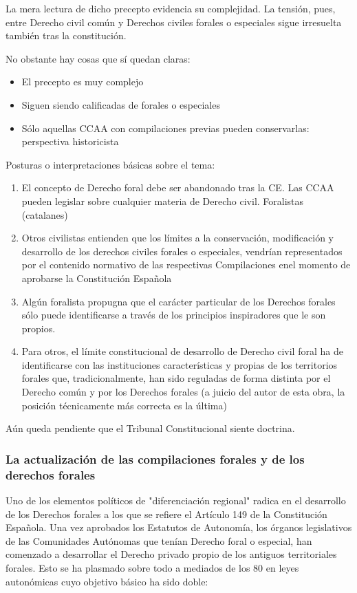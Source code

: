 \documentclass[a4paper,12pt]{report}
\begin{document}
La mera lectura de dicho precepto evidencia su complejidad. La tensión, pues,
entre Derecho civil común y Derechos civiles forales o especiales sigue
irresuelta también tras la constitución.

No obstante hay cosas que sí quedan claras:

\begin{itemize}
    \item{El precepto es muy complejo}
    \item{Siguen siendo calificadas de forales o especiales}
    \item{Sólo aquellas CCAA con compilaciones previas pueden conservarlas:
        perspectiva historicista}
\end{itemize}

Posturas o interpretaciones básicas sobre el tema:

\begin{enumerate}
\item{El concepto de Derecho foral debe ser abandonado tras la CE. Las CCAA
    pueden legislar sobre cualquier materia de Derecho civil. Foralistas
(catalanes)}
\item{Otros civilistas entienden que los límites a la conservación, modificación
    y desarrollo de los derechos civiles forales o especiales, vendrían
representados por el contenido normativo de las respectivas Compilaciones enel
momento de aprobarse la Constitución Española}
\item{Algún foralista propugna que el carácter particular de los Derechos
    forales sólo puede identificarse a través de los principios inspiradores que
le son propios.}
\item{Para otros, el límite constitucional de desarrollo de Derecho civil foral
    ha de identificarse con las instituciones características y propias de los
territorios forales que, tradicionalmente, han sido reguladas de forma distinta
por el Derecho común y por los Derechos forales (a juicio del autor de esta
obra, la posición técnicamente más correcta es la última)}
\end{enumerate}

Aún queda pendiente que el Tribunal Constitucional siente doctrina.

\subsubsection{La actualización de las compilaciones forales y de los derechos forales}

Uno de los elementos políticos de "diferenciación regional" radica en el
desarrollo de los Derechos forales a los que se refiere el Artículo 149 de la
Constitución Española. Una vez aprobados los Estatutos de Autonomía, los órganos
legislativos de las Comunidades Autónomas que tenían Derecho foral o especial,
han comenzado a desarrollar el Derecho privado propio de los antiguos
territoriales forales. Esto se ha plasmado sobre todo a mediados de los 80 en
leyes autonómicas cuyo objetivo básico ha sido doble:
\end{document}

